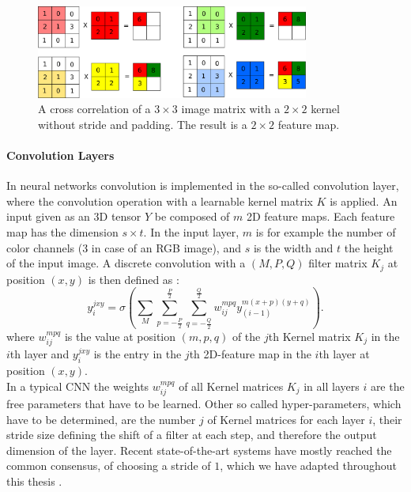 \begin{figure}
	\centering
    	\includegraphics[width=0.8\textwidth]{imgs/convolution.png} 
    \caption[A cross correlation of a $3\times3$ image matrix with a $2\times2$ kernel.]{A cross correlation of a $3\times3$ image matrix with a $2\times2$ kernel without stride and padding. The result is a $2\times2$ feature map.}
	\label{fig:conv}
\end{figure}

\paragraph{Convolution Layers} \label{c:convlayers}

In neural networks convolution is implemented in the so-called convolution layer, where the convolution operation with a learnable kernel matrix $K$ is applied. 
An input given as an 3D tensor $Y$ be composed of $m$ 2D feature maps. Each feature map has the dimension $s \times t$. 
In the input layer, $m$ is for example the number of color channels (3 in case of an RGB image), and $s$ is the width and $t$ the height of the input image. 
A discrete convolution with a $(M , P , Q)$ filter matrix $K_j$ at position $(x,y)$ is then defined as : 
\[
y_{i}^{jxy} = \sigma(\sum_M \sum_{p=-\frac{P}{2}}^{\frac{P}{2}} \sum_{q=-\frac{Q}{2}}^{\frac{Q}{2}} w_{ij}^{mpq} y_{(i-1)}^{m(x+p)(y+q)}) .
\]
where $w_{ij}^{mpq}$ is the value at position $(m,p,q)$ of the $j$th Kernel matrix $K_j$ in the $i$th layer and $y_{i}^{jxy}$ is the entry in the $j$th 2D-feature map in the $i$th layer at position $(x, y)$.\\
In a typical CNN the weights $w_{ij}^{mpq}$ of all Kernel matrices $K_j$ in all layers $i$ are the free parameters that have to be learned. 
Other so called hyper-parameters, which have to be determined, are the number $j$ of Kernel matrices for each layer $i$, their stride size defining the shift of a filter at each step, and therefore the output dimension of the layer.
Recent state-of-the-art systems have mostly reached the common consensus, of choosing a stride of $1$, which we have adapted throughout this thesis \cite{simonyan2014very}.


